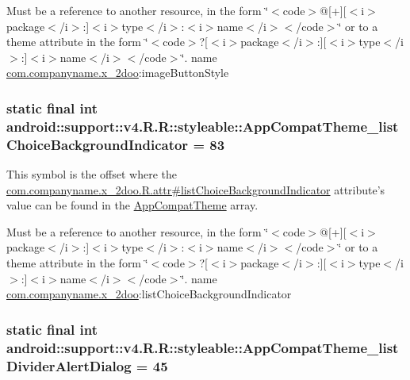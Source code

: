 Must be a reference to another resource, in the form \char`\"{}$<$code$>$@\mbox{[}+\mbox{]}\mbox{[}$<$i$>$package$<$/i$>$:\mbox{]}$<$i$>$type$<$/i$>$:$<$i$>$name$<$/i$>$$<$/code$>$\char`\"{} or to a theme attribute in the form \char`\"{}$<$code$>$?\mbox{[}$<$i$>$package$<$/i$>$:\mbox{]}\mbox{[}$<$i$>$type$<$/i$>$:\mbox{]}$<$i$>$name$<$/i$>$$<$/code$>$\char`\"{}.  name \hyperlink{namespacecom_1_1companyname_1_1x__2doo}{com.companyname.x\_\-2doo}:imageButtonStyle \hypertarget{classandroid_1_1support_1_1v4_1_1_r_1_1styleable_04b55514ebd83ea5a03fba7aec47f213}{
\subsubsection[{AppCompatTheme\_\-listChoiceBackgroundIndicator}]{\setlength{\rightskip}{0pt plus 5cm}static final int android::support::v4.R.R::styleable::AppCompatTheme\_\-listChoiceBackgroundIndicator = 83}}
\label{classandroid_1_1support_1_1v4_1_1_r_1_1styleable_04b55514ebd83ea5a03fba7aec47f213}


This symbol is the offset where the \hyperlink{classcom_1_1companyname_1_1x__2doo_1_1_r_1_1attr_bc8acb5047c51ac2b090c2c0d027aed3}{com.companyname.x\_\-2doo.R.attr\#listChoiceBackgroundIndicator} attribute's value can be found in the \hyperlink{classandroid_1_1support_1_1v4_1_1_r_1_1styleable_0873e92ba21076bb5a4aeadeb7f5779f}{AppCompatTheme} array.

Must be a reference to another resource, in the form \char`\"{}$<$code$>$@\mbox{[}+\mbox{]}\mbox{[}$<$i$>$package$<$/i$>$:\mbox{]}$<$i$>$type$<$/i$>$:$<$i$>$name$<$/i$>$$<$/code$>$\char`\"{} or to a theme attribute in the form \char`\"{}$<$code$>$?\mbox{[}$<$i$>$package$<$/i$>$:\mbox{]}\mbox{[}$<$i$>$type$<$/i$>$:\mbox{]}$<$i$>$name$<$/i$>$$<$/code$>$\char`\"{}.  name \hyperlink{namespacecom_1_1companyname_1_1x__2doo}{com.companyname.x\_\-2doo}:listChoiceBackgroundIndicator \hypertarget{classandroid_1_1support_1_1v4_1_1_r_1_1styleable_76eadcfe0bf32602bc65706cb1655757}{
\subsubsection[{AppCompatTheme\_\-listDividerAlertDialog}]{\setlength{\rightskip}{0pt plus 5cm}static final int android::support::v4.R.R::styleable::AppCompatTheme\_\-listDividerAlertDialog = 45}}
\label{classandroid_1_1support_1_1v4_1_1_r_1_1styleable_76eadcfe0bf32602bc65706cb1655757}


